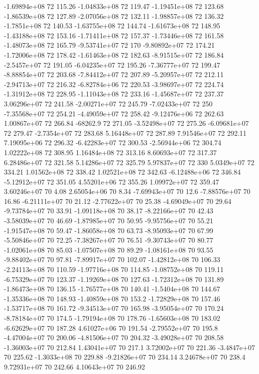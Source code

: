 -1.69894e+08 72 115.26
-1.04833e+08 72 119.47
-1.19451e+08 72 123.68
-1.86539e+08 72 127.89
-2.07056e+08 72 132.11
-1.98857e+08 72 136.32
-1.7851e+08 72 140.53
-1.63755e+08 72 144.74
-1.61673e+08 72 148.95
-1.43188e+08 72 153.16
-1.71411e+08 72 157.37
-1.73446e+08 72 161.58
-1.48073e+08 72 165.79
-9.53741e+07 72 170
-9.80892e+07 72 174.21
-1.72006e+08 72 178.42
-1.61463e+08 72 182.63
-8.91515e+07 72 186.84
-2.5457e+07 72 191.05
-6.04235e+07 72 195.26
-7.36777e+07 72 199.47
-8.88854e+07 72 203.68
-7.84412e+07 72 207.89
-5.20957e+07 72 212.11
-2.94713e+07 72 216.32
-6.82784e+06 72 220.53
-3.98697e+07 72 224.74
-1.31912e+08 72 228.95
-1.11043e+08 72 233.16
-1.45687e+07 72 237.37
3.06296e+07 72 241.58
-2.00271e+07 72 245.79
-7.02433e+07 72 250
-7.35568e+07 72 254.21
-4.49059e+07 72 258.42
-9.12476e+06 72 262.63
1.00867e+07 72 266.84
-68262.9 72 271.05
-3.52498e+07 72 275.26
-6.09681e+07 72 279.47
-2.7354e+07 72 283.68
5.16448e+07 72 287.89
7.91546e+07 72 292.11
7.19095e+06 72 296.32
-6.42283e+07 72 300.53
-2.56944e+06 72 304.74
1.02222e+08 72 308.95
1.16484e+08 72 313.16
8.60693e+07 72 317.37
6.28486e+07 72 321.58
5.14286e+07 72 325.79
5.97837e+07 72 330
5.0349e+07 72 334.21
1.01562e+08 72 338.42
1.02521e+08 72 342.63
-6.12488e+06 72 346.84
-5.12912e+07 72 351.05
4.55201e+06 72 355.26
1.09972e+07 72 359.47
3.60246e+07 70 4.08
2.65054e+06 70 8.34
-7.69943e+07 70 12.6
-7.88576e+07 70 16.86
-6.21111e+07 70 21.12
-2.77622e+07 70 25.38
-4.69049e+07 70 29.64
-9.73784e+07 70 33.91
-1.09118e+08 70 38.17
-8.22166e+07 70 42.43
-3.58039e+07 70 46.69
-1.87985e+07 70 50.95
-9.95756e+07 70 55.21
-1.91547e+08 70 59.47
-1.86058e+08 70 63.73
-8.95093e+07 70 67.99
-5.50846e+07 70 72.25
-7.38267e+07 70 76.51
-9.30743e+07 70 80.77
-1.02061e+08 70 85.03
-1.07507e+08 70 89.29
-1.08161e+08 70 93.55
-9.88402e+07 70 97.81
-7.89917e+07 70 102.07
-1.42812e+08 70 106.33
-2.24113e+08 70 110.59
-1.97716e+08 70 114.85
-1.08752e+08 70 119.11
-6.75329e+07 70 123.37
-1.19269e+08 70 127.63
-1.72312e+08 70 131.89
-1.86473e+08 70 136.15
-1.76577e+08 70 140.41
-1.5404e+08 70 144.67
-1.35336e+08 70 148.93
-1.40859e+08 70 153.2
-1.72829e+08 70 157.46
-1.53717e+08 70 161.72
-9.34513e+07 70 165.98
-3.95054e+07 70 170.24
-8.78184e+07 70 174.5
-1.79194e+08 70 178.76
-1.65603e+08 70 183.02
-6.62629e+07 70 187.28
4.61027e+06 70 191.54
-2.79552e+07 70 195.8
-4.47004e+07 70 200.06
-4.81506e+07 70 204.32
-3.49028e+07 70 208.58
-1.36003e+07 70 212.84
1.43041e+07 70 217.1
3.72002e+07 70 221.36
-3.4847e+07 70 225.62
-1.3033e+08 70 229.88
-9.21826e+07 70 234.14
3.24678e+07 70 238.4
9.72931e+07 70 242.66
4.10643e+07 70 246.92
